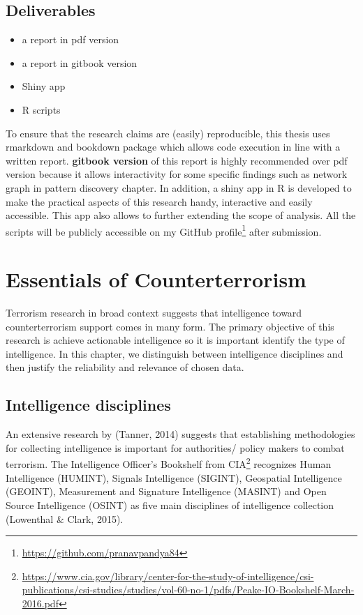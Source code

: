 \documentclass[11pt,oneside,a4paper]{reedthesis}
\providecommand{\tightlist}{%
  \setlength{\itemsep}{0pt}\setlength{\parskip}{0pt}}
\begin{document}
\section*{Deliverables}\label{deliverables}
\begin{itemize}
\tightlist
\item
  a report in pdf version
\item
  a report in gitbook version
\item
  Shiny app
\item
  R scripts
\end{itemize}
To ensure that the research claims are (easily) reproducible, this
thesis uses rmarkdown and bookdown package which allows code execution
in line with a written report. \textbf{gitbook version} of this report
is highly recommended over pdf version because it allows interactivity
for some specific findings such as network graph in pattern discovery
chapter. In addition, a shiny app in R is developed to make the
practical aspects of this research handy, interactive and easily
accessible. This app also allows to further extending the scope of
analysis. All the scripts will be publicly accessible on my GitHub
profile\footnote{\url{https://github.com/pranavpandya84}} after
submission.

\hypertarget{essentials-counter}{\chapter{Essentials of
Counterterrorism}\label{essentials-counter}}

Terrorism research in broad context suggests that intelligence toward
counterterrorism support comes in many form. The primary objective of
this research is achieve actionable intelligence so it is important
identify the type of intelligence. In this chapter, we distinguish
between intelligence disciplines and then justify the reliability and
relevance of chosen data.

\section{Intelligence disciplines}\label{intelligence-disciplines}

An extensive research by (Tanner, 2014) suggests that establishing
methodologies for collecting intelligence is important for authorities/
policy makers to combat terrorism. The Intelligence Officer's Bookshelf
from CIA\footnote{\url{https://www.cia.gov/library/center-for-the-study-of-intelligence/csi-publications/csi-studies/studies/vol-60-no-1/pdfs/Peake-IO-Bookshelf-March-2016.pdf}}
recognizes Human Intelligence (HUMINT), Signals Intelligence (SIGINT),
Geospatial Intelligence (GEOINT), Measurement and Signature Intelligence
(MASINT) and Open Source Intelligence (OSINT) as five main disciplines
of intelligence collection (Lowenthal \& Clark, 2015).
\end{document}
